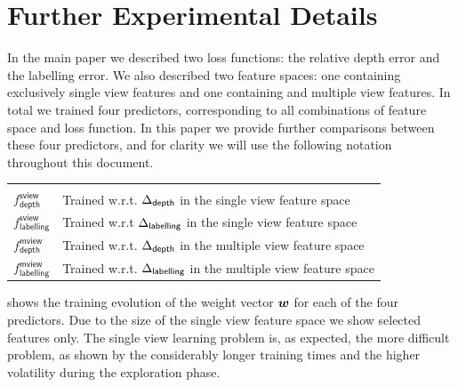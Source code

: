 \section{Further Experimental Details}

\newcommand\Fsviewdepth{f^{\textsf{sview}}_{\textsf{depth}}}
\newcommand\Fsviewlbl{f^{\textsf{sview}}_{\textsf{labelling}}}
\newcommand\Fmviewdepth{f^{\textsf{mview}}_{\textsf{depth}}}
\newcommand\Fmviewlbl{f^{\textsf{mview}}_{\textsf{labelling}}}

In the main paper we described two loss functions: the relative depth
error and the labelling error. We also described two feature spaces:
one containing exclusively single view features and one containing
and multiple view features. In total we trained four predictors,
corresponding to all combinations of feature space and loss
function. In this paper we provide further comparisons between these
four predictors, and for clarity we will use the following notation
throughout this document.

\begin{tabular}{p{20mm}l}
  &\\
  $\Fsviewdepth$ & Trained w.r.t.
  $\Delta_{\textsf{depth}}$ in the single view feature space \vspace{2mm} \\
  $\Fsviewlbl$ & Trained w.r.t
  $\Delta_{\textsf{labelling}}$ in the single view feature space \vspace{2mm} \\
  $\Fmviewdepth$ & Trained w.r.t.
  $\Delta_{\textsf{depth}}$ in the multiple view feature space \vspace{2mm} \\
  $\Fmviewlbl$ & Trained w.r.t.
  $\Delta_{\textsf{labelling}}$ in the multiple view feature space \vspace{2mm} 
\end{tabular}

 shows the training evolution of the weight
vector $\boldsymbol{w}$ for each of the four predictors. Due to the size of
the single view feature space we show selected features only. The
single view learning problem is, as expected, the more difficult
problem, as shown by the considerably longer training times and the
higher volatility during the exploration phase.

